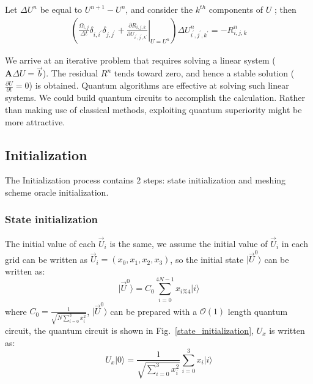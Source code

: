 \documentclass[%
 reprint,
 amsmath,amssymb,
pra,
]{revtex4-1}
\begin{document}
Let $\Delta U^{n}$ be equal to $U^{n+1}-U^{n}$, and consider the $k^{th}$ components of $U$ \cite{economon2016su2}; then
\begin{align}
\left(\frac{\Omega_{i, j}}{\Delta t}\delta_{i, i^\prime}\delta_{j, j^\prime}
+\left.\frac{\partial R_{i,j,k}}{\partial U_{i^\prime,j^\prime,k^\prime}}\right|_{U=U^n}\right) \Delta U^{n}_{i^\prime,j^\prime,k^\prime} = -R^{n}_{i,j,k}
\end{align}

We arrive at an iterative problem that requires solving a linear system ($\bm{A} \Delta U = \vec{b}$). The residual $R^{n}$ tends toward zero, and hence a stable solution ($\frac{\partial U}{\partial t} = 0$) is obtained. Quantum algorithms are effective at solving such linear systems. We could build quantum circuits to accomplish the calculation. Rather than making use of classical methods, exploiting quantum superiority might be more attractive.

\subsection{Initialization}

The Initialization process contains 2 steps: state initialization and meshing scheme oracle initialization.
\subsubsection{State initialization}
The initial value of  each $\vec{U}_i$ is the same, we assume the initial value of $\vec{U}_i$ in each grid can be written as $\vec{U}_i=(x_0,x_1,x_2,x_3)$, so the initial state  $|\vec{U}^0\rangle$ can be written as:
\begin{equation}
|\vec{U}^0\rangle=C_0\sum_{i=0}^{4N-1}{x_{i\%4}|i\rangle}
\end{equation}
where $C_0=\frac{1}{\sqrt{N\sum_{i=0}^{3}{x_i^2}}}$, $|\vec{U}^0\rangle$ can be prepared with a $\mathcal{O}(1)$ length quantum circuit, the quantum circuit is shown in Fig.~\ref{state_initialization}, $U_x$ is written as:
\begin{equation}
U_x|0\rangle=\frac{1}{\sqrt{\sum_{i=0}^{3}{x_i^2}}}\sum_{i=0}^{3}{x_i|i\rangle}
\end{equation}
\end{document}
